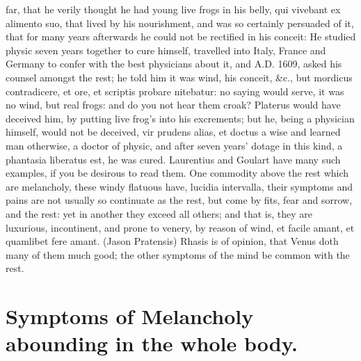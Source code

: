 {far, that he verily thought he had young live frogs in his belly, qui
vivebant ex alimento suo, that lived by his nourishment, and was so
certainly persuaded of it, that for many years afterwards he could not
be rectified in his conceit: He studied physic seven years together to
cure himself, travelled into Italy, France and Germany to confer with
the best physicians about it, and A.D. 1609, asked his counsel amongst
the rest; he told him it was wind, his conceit, \&c., but mordicus
contradicere, et ore, et scriptis probare nitebatur: no saying would
serve, it was no wind, but real frogs: and do you not hear them croak?
Platerus would have deceived him, by putting live frog's into his
excrements; but he, being a physician himself, would not be deceived,
vir prudens alias, et doctus a wise and learned man otherwise, a doctor
of physic, and after seven years' dotage in this kind, a phantasia
liberatus est, he was cured. Laurentius and Goulart have many such
examples, if you be desirous to read them. One commodity above the rest
which are melancholy, these windy flatuous have, lucidia intervalla,
their symptoms and pains are not usually so continuate as the rest, but
come by fits, fear and sorrow, and the rest: yet in another they exceed
all others; and that is, they are luxurious, incontinent, and
prone to venery, by reason of wind, et facile amant, et quamlibet fere
amant. (Jason Pratensis) Rhasis is of opinion, that Venus doth
many of them much good; the other symptoms of the mind be common with
the rest.

\section[Symptoms In the Whole Body]{Symptoms of Melancholy abounding in the whole body.}

}
